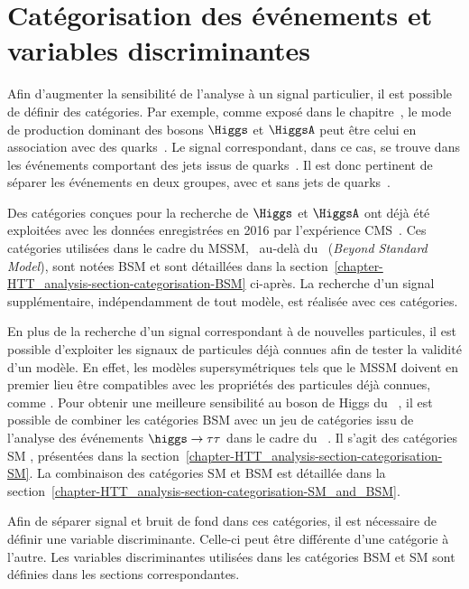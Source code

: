 \section{Catégorisation des événements et variables discriminantes}\label{chapter-HTT_analysis-section-categorisation}
Afin d'augmenter la sensibilité de l'analyse à un signal particulier, il est possible de définir des catégories.
Par exemple, comme exposé dans le chapitre~, le mode de production dominant des bosons $\Higgs$ et $\HiggsA$ peut être celui en association avec des quarks~\quarkb.
Le signal correspondant, dans ce cas, se trouve dans les événements comportant des jets issus de quarks~\quarkb.
Il est donc pertinent de séparer les événements en deux groupes, avec et sans jets de quarks~\quarkb.
\par
Des catégories conçues pour la recherche de $\Higgs$ et $\HiggsA$ ont déjà été exploitées avec les données enregistrées en 2016 par l'expérience CMS~\cite{CMS-PAS-HIG-17-020}.
Ces catégories utilisées dans le cadre du MSSM, \ie\ au-delà du \SM\ (\emph{Beyond Standard Model}), sont notées \og BSM \fg{} et sont détaillées dans la section~\ref{chapter-HTT_analysis-section-categorisation-BSM} ci-après.
La recherche d'un signal supplémentaire, indépendamment de tout modèle, est réalisée avec ces catégories.
\par
En plus de la recherche d'un signal correspondant à de nouvelles particules, il est possible d'exploiter les signaux de particules déjà connues afin de tester la validité d'un modèle.
En effet, les modèles supersymétriques tels que le MSSM doivent en premier lieu être compatibles avec les propriétés des particules déjà connues, comme \higgs.
Pour obtenir une meilleure sensibilité au boson de Higgs du \SM\ \higgs, il est possible de combiner les catégories BSM avec un jeu de catégories issu de l'analyse des événements $\higgs\to\tau\tau$ dans le cadre du \SM~\cite{CMS-PAS-HIG-19-010,CMS-NOTE-2019-177,CMS-NOTE-2019-178}.
Il s'agit des catégories \og SM \fg, présentées dans la section~\ref{chapter-HTT_analysis-section-categorisation-SM}.
La combinaison des catégories SM et BSM est détaillée dans la section~\ref{chapter-HTT_analysis-section-categorisation-SM_and_BSM}.
\par
Afin de séparer signal et bruit de fond dans ces catégories, il est nécessaire de définir une variable discriminante.
Celle-ci peut être différente d'une catégorie à l'autre.
Les variables discriminantes utilisées dans les catégories BSM et SM sont définies dans les sections correspondantes.



